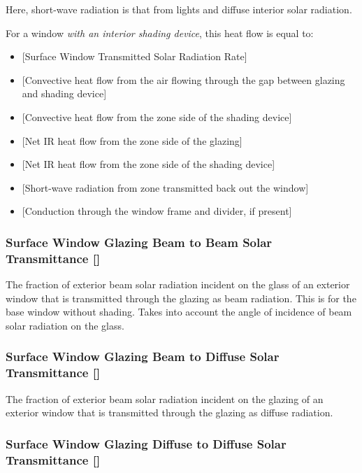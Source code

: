 Here, short-wave radiation is that from lights and diffuse interior solar radiation.

For a window \emph{with an interior shading device}, this heat flow is equal to:


\begin{itemize}
\item
  {[}Surface Window Transmitted Solar Radiation Rate{]}
\item
  {[}Convective heat flow from the air flowing through the gap between glazing and shading device{]}
\item
  {[}Convective heat flow from the zone side of the shading device{]}
\item
  {[}Net IR heat flow from the zone side of the glazing{]}
\item
  {[}Net IR heat flow from the zone side of the shading device{]}
\item
  {[}Short-wave radiation from zone transmitted back out the window{]}
\item
  {[}Conduction through the window frame and divider, if present{]}
\end{itemize}

\subsubsection{Surface Window Glazing Beam to Beam Solar Transmittance {[]}}\label{surface-window-glazing-beam-to-beam-solar-transmittance}

The fraction of exterior beam solar radiation incident on the glass of an exterior window that is transmitted through the glazing as beam radiation. This is for the base window without shading. Takes into account the angle of incidence of beam solar radiation on the glass.

\subsubsection{Surface Window Glazing Beam to Diffuse Solar Transmittance {[]}}\label{surface-window-glazing-beam-to-diffuse-solar-transmittance}

The fraction of exterior beam solar radiation incident on the glazing of an exterior window that is transmitted through the glazing as diffuse radiation.

\subsubsection{Surface Window Glazing Diffuse to Diffuse Solar Transmittance {[]}}\label{surface-window-glazing-diffuse-to-diffuse-solar-transmittance}

